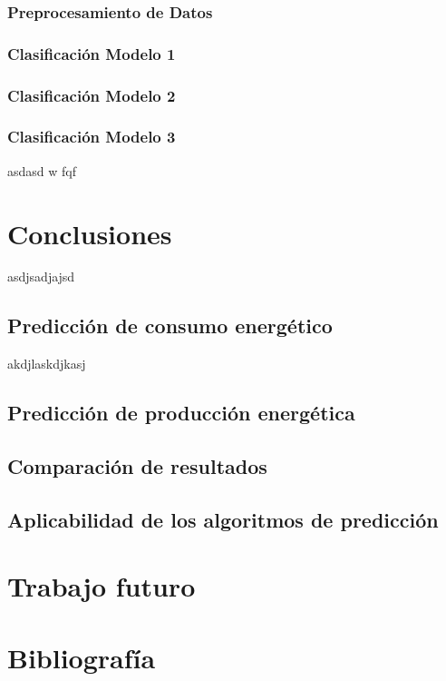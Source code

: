 \documentclass[a4paper,12pt]{article}
\begin{document}
\subsubsection{Preprocesamiento de Datos}

\subsubsection{Clasificación Modelo 1}

\subsubsection{Clasificación Modelo 2}

\subsubsection{Clasificación Modelo 3}

asdasd w fqf

\section{Conclusiones}
asdjsadjajsd

\subsection{Predicción de consumo energético}
akdjlaskdjkasj

\subsection{Predicción de producción energética}

\subsection{Comparación de resultados}

\subsection{Aplicabilidad de los algoritmos de predicción}

\section{Trabajo futuro}

\section*{Bibliografía}

\printbibliography
\end{document}
